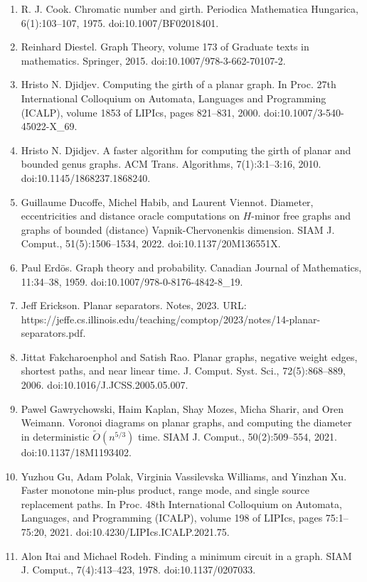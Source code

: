 \documentclass[10pt,a4paper]{article}
\begin{document}
\begin{enumerate}
\item[]  [22]  R. J. Cook.  Chromatic number and girth.  Periodica Mathematica Hungarica, 6(1):103–107, 1975.  doi:10.1007/BF02018401.  
\item[]  [23]  Reinhard Diestel.  Graph Theory, volume 173 of Graduate texts in mathematics.  Springer, 2015.  doi:10.1007/978-3-662-70107-2.  
\item[]  [24]  Hristo N. Djidjev.  Computing the girth of a planar graph.  In Proc. 27th International Colloquium on Automata, Languages and Programming (ICALP), volume 1853 of LIPIcs, pages 821–831, 2000.  doi:10.1007/3-540-45022-X\_69.  
\item[]  [25]  Hristo N. Djidjev.  A faster algorithm for computing the girth of planar and bounded genus graphs.  ACM Trans. Algorithms, 7(1):3:1–3:16, 2010.  doi:10.1145/1868237.1868240.  
\item[]  [26]  Guillaume Ducoffe, Michel Habib, and Laurent Viennot.  Diameter, eccentricities and distance oracle computations on $H$-minor free graphs and graphs of bounded (distance) Vapnik-Chervonenkis dimension.  SIAM J. Comput., 51(5):1506–1534, 2022.  doi:10.1137/20M136551X.  
\item[]  [27]  Paul Erdös.  Graph theory and probability.  Canadian Journal of Mathematics, 11:34–38, 1959.  doi:10.1007/978-0-8176-4842-8\_19.  
\item[]  [28]  Jeff Erickson.  Planar separators.  Notes, 2023.  URL: https://jeffe.cs.illinois.edu/teaching/comptop/2023/notes/14-planar-separators.pdf.  
\item[]  [29]  Jittat Fakcharoenphol and Satish Rao.  Planar graphs, negative weight edges, shortest paths, and near linear time.  J. Comput. Syst. Sci., 72(5):868–889, 2006.  doi:10.1016/J.JCSS.2005.05.007.  
\item[]  [30]  Pawel Gawrychowski, Haim Kaplan, Shay Mozes, Micha Sharir, and Oren Weimann.  Voronoi diagrams on planar graphs, and computing the diameter in deterministic $\tilde{O}(n^{5/3})$ time.  SIAM J. Comput., 50(2):509–554, 2021.  doi:10.1137/18M1193402.  
\item[]  [31]  Yuzhou Gu, Adam Polak, Virginia Vassilevska Williams, and Yinzhan Xu.  Faster monotone min-plus product, range mode, and single source replacement paths.  In Proc. 48th International Colloquium on Automata, Languages, and Programming (ICALP), volume 198 of LIPIcs, pages 75:1–75:20, 2021.  doi:10.4230/LIPIcs.ICALP.2021.75.  
\item[]  [32]  Alon Itai and Michael Rodeh.  Finding a minimum circuit in a graph.  SIAM J. Comput., 7(4):413–423, 1978.  doi:10.1137/0207033.  

\end{enumerate}
\end{document}
